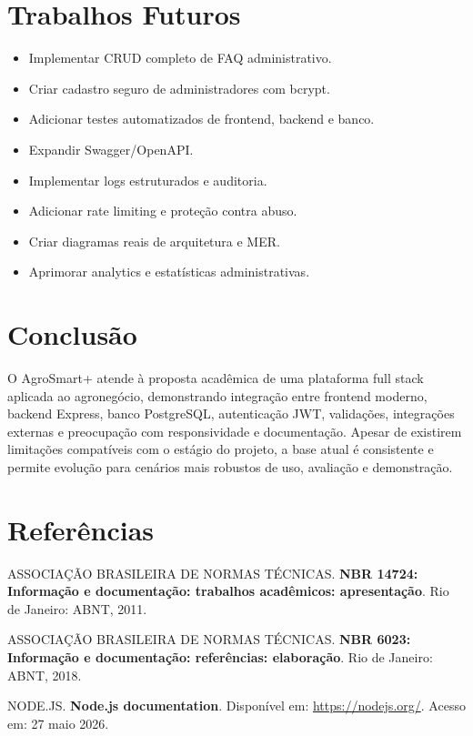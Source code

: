 \documentclass[
  12pt,
  oneside,
  a4paper,
  brazil
]{abntex2}
\begin{document}
\chapter{Trabalhos Futuros}

\begin{itemize}
  \item Implementar CRUD completo de FAQ administrativo.
  \item Criar cadastro seguro de administradores com bcrypt.
  \item Adicionar testes automatizados de frontend, backend e banco.
  \item Expandir Swagger/OpenAPI.
  \item Implementar logs estruturados e auditoria.
  \item Adicionar rate limiting e proteção contra abuso.
  \item Criar diagramas reais de arquitetura e MER.
  \item Aprimorar analytics e estatísticas administrativas.
\end{itemize}

\chapter{Conclusão}

O AgroSmart+ atende à proposta acadêmica de uma plataforma full stack aplicada ao agronegócio, demonstrando integração entre frontend moderno, backend Express, banco PostgreSQL, autenticação JWT, validações, integrações externas e preocupação com responsividade e documentação. Apesar de existirem limitações compatíveis com o estágio do projeto, a base atual é consistente e permite evolução para cenários mais robustos de uso, avaliação e demonstração.

\postextual

\chapter*{Referências}

ASSOCIAÇÃO BRASILEIRA DE NORMAS TÉCNICAS. \textbf{NBR 14724: Informação e documentação: trabalhos acadêmicos: apresentação}. Rio de Janeiro: ABNT, 2011.

ASSOCIAÇÃO BRASILEIRA DE NORMAS TÉCNICAS. \textbf{NBR 6023: Informação e documentação: referências: elaboração}. Rio de Janeiro: ABNT, 2018.

NODE.JS. \textbf{Node.js documentation}. Disponível em: \url{https://nodejs.org/}. Acesso em: 27 maio 2026.
\end{document}
